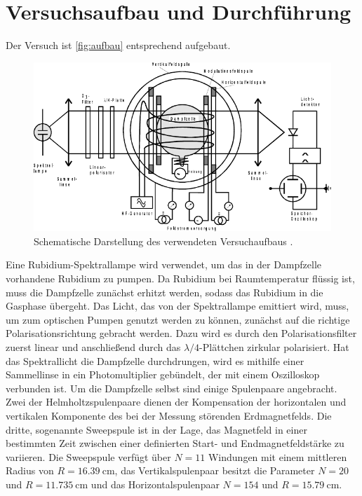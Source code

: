 \section{Versuchsaufbau und Durchführung}
\label{sec:Durchführung}

Der Versuch ist \autoref{fig:aufbau} entsprechend aufgebaut.
\begin{figure}
    \centering
    \includegraphics{figures/Aufbau.pdf}
    \caption{Schematische Darstellung des verwendeten Versuchaufbaus \cite{v21}.}
    \label{fig:aufbau}
\end{figure}

Eine Rubidium-Spektrallampe wird verwendet, um das in der Dampfzelle vorhandene Rubidium zu pumpen.
Da Rubidium bei Raumtemperatur flüssig ist, muss die Dampfzelle zunächst erhitzt werden, sodass das Rubidium in die Gasphase übergeht.
Das Licht, das von der Spektrallampe emittiert wird, muss, um zum optischen Pumpen genutzt werden zu können, zunächst auf die richtige Polarisationsrichtung gebracht werden.
Dazu wird es durch den Polarisationsfilter zuerst linear und anschließend durch das $\lambda/4$-Plättchen zirkular polarisiert.
Hat das Spektrallicht die Dampfzelle durchdrungen, wird es mithilfe einer Sammellinse in ein Photomultiplier gebündelt, der mit einem Oszilloskop verbunden ist.
Um die Dampfzelle selbst sind einige Spulenpaare angebracht.
Zwei der Helmholtzspulenpaare dienen der Kompensation der horizontalen und vertikalen Komponente des bei der Messung störenden Erdmagnetfelds.
Die dritte, sogenannte Sweepspule ist in der Lage, das Magnetfeld in einer bestimmten Zeit zwischen einer definierten Start- und Endmagnetfeldstärke zu variieren.
Die Sweepspule verfügt über $N = 11$ Windungen mit einem mittleren Radius von $R = \SI{16.39}{\centi\meter}$, das Vertikalspulenpaar besitzt die Parameter $N = 20$ und $R = \SI{11.735}{\centi\meter}$ und
das Horizontalspulenpaar $N = 154$ und $R = \SI{15.79}{\centi\meter}$.

